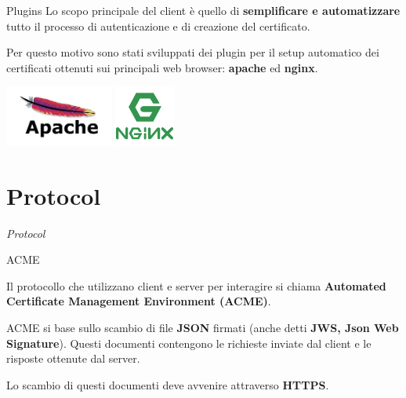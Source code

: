 \documentclass[xcolor=svgnames,11pt]{beamer}
\begin{document}
\begin{frame}{Plugins}
Lo scopo principale del client è quello di \textbf{semplificare e automatizzare} tutto il processo di
autenticazione e di creazione del certificato.

\medskip\pause

Per questo motivo sono stati sviluppati dei plugin per il setup automatico dei certificati ottenuti
sui principali web browser: \textbf{apache} ed \textbf{nginx}.

\begin{center}
\includegraphics[height=2cm]{img/apache_logo.png}
\includegraphics[height=2cm]{img/nginx_logo.png}
\end{center}

\end{frame}

\section{Protocol}
\begin{frame}{}
\begin{center}
\begin{Huge}
\textcolor{leorange}{\emph{Protocol}}
\end{Huge}
\end{center}
\end{frame}


\begin{frame}{ACME}

\begin{block}{}
Il protocollo che utilizzano client e server per interagire si chiama \textbf{Automated Certificate Management Environment (ACME)}.
\end{block}

\medskip \pause
ACME si base sullo scambio di file \textbf{JSON} firmati (anche detti \textbf{JWS, Json Web Signature}).
Questi documenti contengono le richieste inviate dal client e le risposte ottenute dal server.

\medskip \pause
Lo scambio di questi documenti deve avvenire attraverso \textbf{HTTPS}.
\end{frame}
\end{document}
